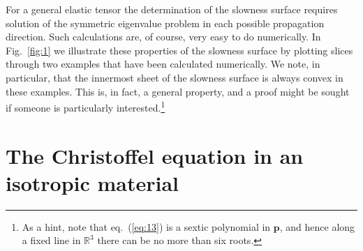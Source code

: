 For a general elastic tensor the determination of the slowness surface requires solution of the symmetric eigenvalue problem in each possible propagation direction. Such calculations are, of course, very easy to do numerically. 
In Fig.~\ref{fig:1} we illustrate these properties of the slowness surface by plotting slices through two examples that have been calculated numerically. We note, in particular, that the innermost sheet of the slowness surface is always 
convex in these examples. This is, in fact, a general property, and a proof might be sought if someone is particularly interested.\footnote{As a hint, note that eq.~(\ref{eq:13}) is a sextic polynomial in $\mathbf{p}$, and hence along a fixed line in $\mathbb{R}^{3}$ there can be no more than six roots.}

\section*{The Christoffel equation in an isotropic material}

